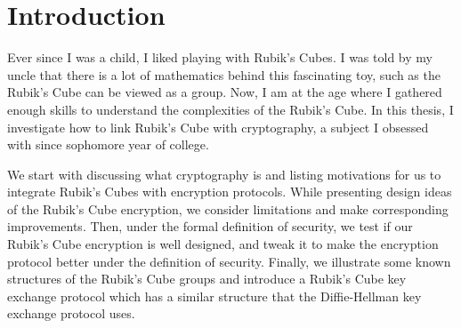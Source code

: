 \chapter{Introduction}\label{chap:introduction}
\par Ever since I was a child, I liked playing with Rubik's Cubes. I was told by my uncle that there is a lot of mathematics behind this fascinating toy, such as the Rubik's Cube can be viewed as a group. Now, I am at the age where I gathered enough skills to understand the complexities of the Rubik's Cube. In this thesis, I investigate how to link Rubik's Cube with cryptography, a subject I obsessed with since sophomore year of college.
\par We start with discussing what cryptography is and listing motivations for us to integrate Rubik's Cubes with encryption protocols. While presenting design ideas of the Rubik's Cube encryption, we consider limitations and make corresponding improvements. Then, under the formal definition of security, we test if our Rubik's Cube encryption is well designed, and tweak it to make the encryption protocol better under the definition of security. Finally, we illustrate some known structures of the Rubik's Cube groups and introduce a Rubik's Cube key exchange protocol which has a similar structure that the Diffie-Hellman key exchange protocol uses.

